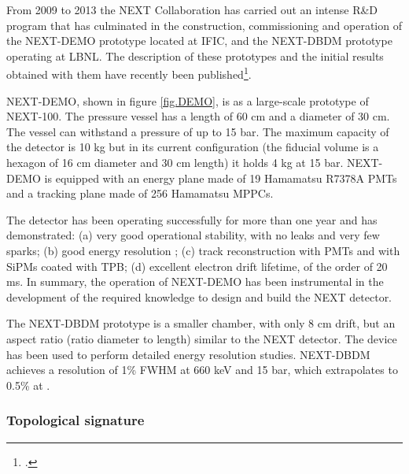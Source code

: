 From 2009 to 2013 the NEXT Collaboration has carried out an intense R\&D program that has culminated in the construction, commissioning and operation of the NEXT-DEMO prototype located at IFIC, and the NEXT-DBDM prototype operating at LBNL. The description of these prototypes and the initial results obtained with them have recently been published\footcite{Alvarez:2012hh, Alvarez:2012nd, Alvarez:2012hu}.

NEXT-DEMO, shown in figure \ref{fig.DEMO}, is as a large-scale prototype of NEXT-100. The pressure vessel has a length of 60 cm and a diameter of 30 cm. The vessel can withstand a pressure of up to 15 bar. The maximum capacity of the detector is 10 kg but in its current configuration (the fiducial volume is a hexagon of 16 cm diameter and 30 cm length) it holds 4 kg at 15 bar. NEXT-DEMO is  equipped with an energy plane made of 19 Hamamatsu R7378A PMTs and a tracking plane made of 256 Hamamatsu MPPCs. 

The detector has been operating successfully for more than one year and has demonstrated: (a) very good operational stability, with no leaks and very few sparks; (b) good energy resolution ; (c) track reconstruction with PMTs and with SiPMs coated with TPB; (d) excellent electron drift lifetime, of the order of 20 ms. In summary, the operation of NEXT-DEMO has been instrumental in the development of the required knowledge to design and build the NEXT detector.

The NEXT-DBDM prototype is a smaller chamber, with only 8 cm drift, but an aspect ratio (ratio diameter to length) similar to the NEXT detector. The device has been used to perform detailed energy resolution studies. NEXT-DBDM achieves a resolution of 1\% FWHM at 660 keV and 15 bar, which extrapolates to 0.5\% at \Qbb.

\subsubsection*{Topological signature}

